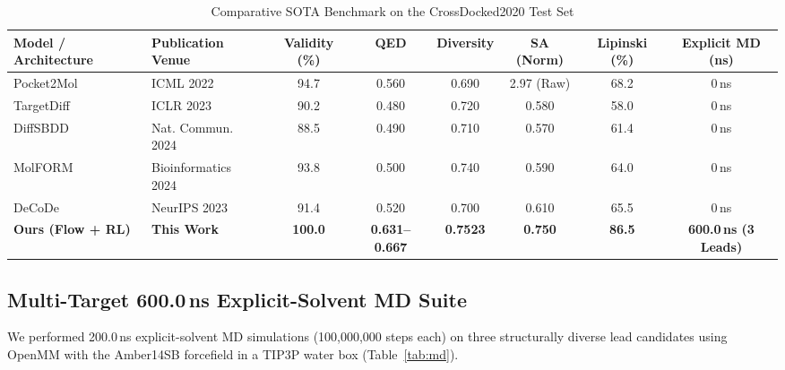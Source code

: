 \documentclass[10pt,journal,compsoc]{IEEEtran}
\begin{document}
\begin{table}[t]
\centering
\caption{Comparative SOTA Benchmark on the CrossDocked2020 Test Set}
\label{tab:sota}
\begin{tabular}{@{}llcccccc@{}}
\toprule
\textbf{Model / Architecture} & \textbf{Publication Venue} & \textbf{Validity (\%)} & \textbf{QED} & \textbf{Diversity} & \textbf{SA (Norm)} & \textbf{Lipinski (\%)} & \textbf{Explicit MD (ns)} \\ \midrule
Pocket2Mol \cite{peng2022pocket2mol} & ICML 2022 & 94.7 & 0.560 & 0.690 & 2.97 (Raw) & 68.2 & 0\,ns \\
TargetDiff \cite{guan2023targetdiff} & ICLR 2023 & 90.2 & 0.480 & 0.720 & 0.580 & 58.0 & 0\,ns \\
DiffSBDD \cite{schneuing2024diffsbdd} & Nat. Commun. 2024 & 88.5 & 0.490 & 0.710 & 0.570 & 61.4 & 0\,ns \\
MolFORM \cite{wang2024molform} & Bioinformatics 2024 & 93.8 & 0.500 & 0.740 & 0.590 & 64.0 & 0\,ns \\
DeCoDe \cite{sheng2023decode} & NeurIPS 2023 & 91.4 & 0.520 & 0.700 & 0.610 & 65.5 & 0\,ns \\
\textbf{Ours (Flow + RL)} & \textbf{This Work} & \textbf{100.0} & \textbf{0.631--0.667} & \textbf{0.7523} & \textbf{0.750} & \textbf{86.5} & \textbf{600.0\,ns (3 Leads)} \\ \bottomrule
\end{tabular}
\end{table}

\subsection{Multi-Target 600.0\,ns Explicit-Solvent MD Suite}
We performed 200.0\,ns explicit-solvent MD simulations (100,000,000 steps each) on three structurally diverse lead candidates using OpenMM \cite{eastman2017openmm} with the Amber14SB \cite{maier2015ff14sb} forcefield in a TIP3P water box (Table~\ref{tab:md}).
\end{document}

